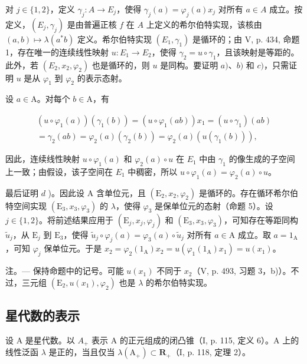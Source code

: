 对 \(j \in \{1,2\}\)，定义 \(\gamma_j \colon A \to E_j\)，使得 \(\gamma_j(a) = \varphi_j(a)x_j\) 对所有 \(a \in A\) 成立。按定义，\((E_j, \gamma_j)\) 是由普遍正核 \(f\) 在 \(A\) 上定义的希尔伯特实现，该核由 \((a,b) \mapsto \lambda(a^*b)\) 定义。希尔伯特实现 \((E_1, \gamma_1)\) 是循环的；由 V, p. 434, 命题 1，存在唯一的连续线性映射 \(u \colon E_1 \to E_2\)，使得 \(\gamma_2 = u \circ \gamma_1\)，且该映射是等距的。此外，若 \((E_2, x_2, \varphi_2)\) 也是循环的，则 \(u\) 是同构。要证明 \(a)\)、\(b)\) 和 \(c)\)，只需证明 \(u\) 是从 \(\varphi_1\) 到 \(\varphi_2\) 的表示态射。

设 \(a \in \mathrm{A}\)。对每个 \(b \in \mathrm{A}\)，有

\[
\begin{array}{c} (u \circ \varphi_ {1} (a)) (\gamma_ {1} (b)) = (u \circ \varphi_ {1} (a b)) x _ {1} = (u \circ \gamma_ {1}) (a b) \\ = \gamma_ {2} (a b) = \varphi_ {2} (a) (\gamma_ {2} (b)) = \varphi_ {2} (a) (u (\gamma_ {1} (b))), \end{array}
\]

因此，连续线性映射 \(u \circ \varphi_1(a)\) 和 \(\varphi_2(a) \circ u\) 在 \(E_1\) 中由 \(\gamma_1\) 的像生成的子空间上一致；由假设，该子空间在 \(E_1\) 中稠密，所以 \(u \circ \varphi_1(a) = \varphi_2(a) \circ u\)。

最后证明 \(d\) )。因此设 A 含单位元，且 \((\mathrm{E}_2, x_2, \varphi_2)\) 是循环的。存在循环希尔伯特空间实现 \((\mathrm{E}_3, x_3, \varphi_3)\) 的 \(\lambda\)，使得 \(\varphi_3\) 是保单位元的态射（命题 5）。设 \(j \in \{1, 2\}\)。将前述结果应用于 \((\mathrm{E}_j, x_j, \varphi_j)\) 和 \((\mathrm{E}_3, x_3, \varphi_3)\)，可知存在等距同构 \(\widetilde{u}_j\)，从 \(\mathrm{E}_j\) 到 \(\mathrm{E}_3\)，使得 \(\widetilde{u}_j \circ \varphi_j(a) = \varphi_3(a) \circ \widetilde{u}_j\) 对所有 \(a \in \mathrm{A}\) 成立。取 \(a = 1_{\mathrm{A}}\)，可知 \(\varphi_j\) 保单位元。于是 \(x_2 = \varphi_2(1_{\mathrm{A}})x_2 = u(\varphi_1(1_{\mathrm{A}})x_1) = u(x_1)\)。

注。--- 保持命题中的记号。可能 \(u(x_{1})\) 不同于 \(x_{2}\)（V, p. 493, 习题 3，b)）。不过，三元组 \((\mathrm{E}_{2}, u(x_{1}), \varphi_{2})\) 也是 \(\lambda\) 的希尔伯特实现。

\subsection{星代数的表示}

设 A 是星代数。以 \(A_{+}\) 表示 A 的正元组成的闭凸锥（I, p. 115, 定义 6）。A 上的线性泛函 \(\lambda\) 是正的，当且仅当 \(\lambda(\mathrm{A}_{+}) \subset \mathbf{R}_{+}\)（I, p. 118, 定理 2）。

